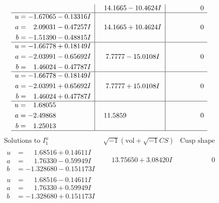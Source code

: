 \documentclass[1p]{elsarticle_modified}
\theoremstyle{definition}
\newcommand{\I}{\sqrt{-1}}
\begin{document}
$$\begin{array}{c|c|c}
 & \phantom{-}14.1665 - 10.4624 I & \phantom{-0.000000 } 0 \\ \hline\begin{aligned}
u &= -1.67065 - 0.13316 I \\
a &= \phantom{-}2.09031 - 0.47257 I \\
b &= -1.51390 - 0.48815 I\end{aligned}
 & \phantom{-}14.1665 + 10.4624 I & \phantom{-0.000000 } 0 \\ \hline\begin{aligned}
u &= -1.66778 + 0.18149 I \\
a &= -2.03991 - 0.65692 I \\
b &= \phantom{-}1.46024 - 0.47787 I\end{aligned}
 & \phantom{-}7.7777 - 15.0108 I & \phantom{-0.000000 } 0 \\ \hline\begin{aligned}
u &= -1.66778 - 0.18149 I \\
a &= -2.03991 + 0.65692 I \\
b &= \phantom{-}1.46024 + 0.47787 I\end{aligned}
 & \phantom{-}7.7777 + 15.0108 I & \phantom{-0.000000 } 0 \\ \hline\begin{aligned}
u &= \phantom{-}1.68055\phantom{ +0.000000I} \\
a &= -2.49868\phantom{ +0.000000I} \\
b &= \phantom{-}1.25013\phantom{ +0.000000I}\end{aligned}
 & \phantom{-}11.5859\phantom{ +0.000000I} & \phantom{-0.000000 } 0\\
 \hline 
 \end{array}$$\newpage$$\begin{array}{c|c|c}  
\text{Solutions to }I^u_{1}& \I (\text{vol} + \sqrt{-1}CS) & \text{Cusp shape}\\
 \hline 
\begin{aligned}
u &= \phantom{-}1.68516 + 0.14611 I \\
a &= \phantom{-}1.76330 - 0.59949 I \\
b &= -1.328680 - 0.151173 I\end{aligned}
 & \phantom{-}13.75650 + 3.08420 I & \phantom{-0.000000 } 0 \\ \hline\begin{aligned}
u &= \phantom{-}1.68516 - 0.14611 I \\
a &= \phantom{-}1.76330 + 0.59949 I \\
b &= -1.328680 + 0.151173 I\end{aligned}

\end{array}$$
\end{document}
